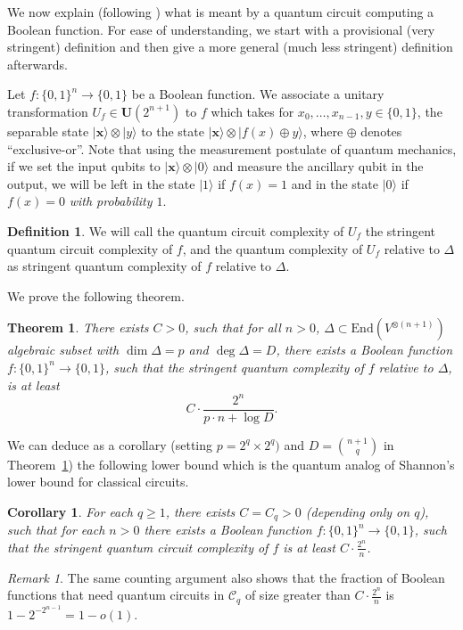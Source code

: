 \documentclass[10pt]{amsart}
\newtheorem{theorem}{Theorem}
\newtheorem{corollary}{Corollary}
\theoremstyle{definition}
\newtheorem{definition}{Definition}[section]
\theoremstyle{remark}
\newtheorem{remark}{Remark}
\numberwithin{equation}{section}
\newcommand {\ra}   {{\rangle}}
\newcommand{\End}{\mathrm{End}}
\begin{document}
We now explain (following \cite{Lipton-Regan}) what is meant by a quantum circuit computing a Boolean function. 
For ease of understanding,  we start with a provisional (very stringent) definition 
and then give a more general (much less stringent)  definition afterwards. 

Let $f: \{0,1\}^n \rightarrow \{0,1\}$ be a Boolean function. We associate a 
unitary transformation $U_f \in \mathbf{U}(2^{n+1})$ to $f$ which takes for
$x_0,\ldots,x_{n-1},y \in \{0,1\}$, the separable state 
$|\mathbf{x} \ra \otimes |y\ra$ to the state 
$|\mathbf{x} \ra \otimes |f(x) \oplus y\ra$, where $\oplus$  denotes ``exclusive-or''.
Note that using the measurement postulate of quantum mechanics, if we 
set the input qubits to $|\mathbf{x}\ra \otimes |0\ra$ and measure
the ancillary qubit in the output, we will be left in the state $|1\ra$ if $f(x) = 1$ and 
in the state $|0\ra$ if $f(x) = 0$ \emph{with probability $1$}.

\begin{definition}
\label{def:quantum-complexity-Boolean}
We will call the quantum circuit complexity of $U_f$ the stringent quantum circuit complexity of $f$, and the 
 quantum complexity of $U_f$ relative to $\Delta$ as
 stringent quantum complexity of $f$ relative to $\Delta$.
\end{definition}


We prove the following theorem.

\begin{theorem}
    \label{thm:quantum1}
    There exists $C > 0$, such that for 
    all $n > 0$, $\Delta \subset \End(V^{\otimes (n+1)})$ algebraic subset  with $\dim \Delta = p$ and $\deg \Delta = D$,
there exists a Boolean function $f:\{0,1\}^n \rightarrow \{0,1\}$, such that the stringent quantum complexity of 
$f$ relative to $\Delta$, is at least 
\[
C \cdot \frac{2^n}{p\cdot n + \log D}.
\]
\end{theorem}


We can deduce as a corollary (setting
$p = 2^q \times 2^q)$ and $D = \binom{n+1}{q}$ in Theorem~\ref{thm:quantum1}) the following lower bound 
which is the quantum analog of Shannon's lower bound for classical circuits.



\begin{corollary}
\label{cor:quantum1}
For each $q \geq 1$, there exists $C=C_q > 0$ (depending only on $q$), such that for each $n >0$ 
there exists a Boolean function $f:\{0,1\}^n \rightarrow \{0,1\}$, such that the stringent quantum circuit complexity of
$f$ is at least $C \cdot \frac{2^n}{n}$. 
\end{corollary}
\begin{remark}
The same counting argument also shows
that the fraction of Boolean functions that need quantum circuits in $\mathcal{C}_q$ of size greater than $C \cdot \frac{2^n}{n}$ is $1- 2^{-2^{n-1}} = 1 - o(1)$.  
\end{remark}
\end{document}
